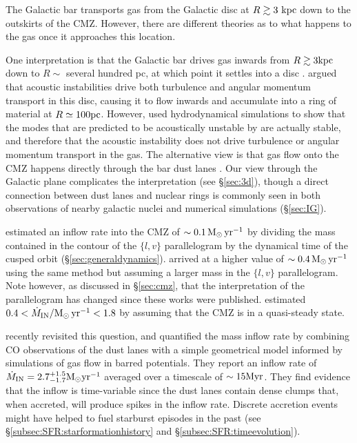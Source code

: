 The Galactic bar transports gas from the Galactic disc at $R\gtrsim3~\mbox{${\rm kpc}$}$ down to the outskirts of the CMZ. However, there are different theories as to what happens to the gas once it approaches this location. 

One interpretation is that the Galactic bar drives gas inwards from $R\gtrsim3\mbox{${\rm kpc}$}$ down to $R\sim$ several hundred pc, at which point it settles into a disc \citep{Krumholz2015, Krumholz2017}. 
\citet[][]{Kruijssen2014a} argued that acoustic instabilities \citep{Montenegro1999} drive both turbulence and angular momentum transport in this disc, causing it to flow inwards and accumulate into a ring of material at $R\simeq 100\mbox{${\rm pc}$}$. 
However, \citet{Sormani2020c} used hydrodynamical simulations to show that the modes that are predicted to be acoustically unstable by \citet{Montenegro1999} are actually stable, and therefore that the acoustic instability does not drive turbulence or angular momentum transport in the gas. 
The alternative view is that gas flow onto the CMZ happens directly through the bar dust lanes \citep[\S\ref{sec:generaldynamics} and Fig.~\ref{fig:sketch};][]{Fux1999,Liszt2006,Liszt2008,Rodriguez-Fernandez2008,Tress2020}. 
Our view through the Galactic plane complicates the interpretation (see \S\ref{sec:3d}), though a direct connection between dust lanes and nuclear rings is commonly seen in both observations of nearby galactic nuclei and numerical simulations (\S\ref{sec:IG}). 

\cite{Gerhard1992} estimated an inflow rate into the CMZ of $\sim0.1\,\mbox{M$_\odot$}\,\mbox{${\rm yr}$}^{-1}$ by dividing the mass contained in the contour of the $\{l,v\}$ parallelogram by the dynamical time of the cusped orbit (\S\ref{sec:generaldynamics}). \cite{Figer2004} arrived at a higher value of $\sim0.4\,\mbox{M$_\odot$}\,\mbox{${\rm yr}$}^{-1}$ using the same method but assuming a larger mass in the $\{l,v\}$ parallelogram. Note however, as discussed in \S\ref{sec:cmz}, that the interpretation of the parallelogram has changed since these works were published. \cite{Crocker2012} estimated $0.4<\dot{M}_\mathrm{IN}/\mbox{M$_\odot$}\,\mbox{${\rm yr}$}^{-1}<1.8$ by assuming that the CMZ is in a quasi-steady state.

\cite{Sormani2019b} recently revisited this question, and quantified the mass inflow rate by combining CO observations of the dust lanes with a simple geometrical model informed by simulations of gas flow in barred potentials. They report an inflow rate of $\dot{M}_\mathrm{IN} = 2.7^{+1.5}_{-1.7} \mbox{M$_\odot$} \mbox{${\rm yr}$}^{-1}$ averaged over a timescale of $\sim 15\mbox{${\rm Myr}$}$. 
They find evidence that the inflow is time-variable since the dust lanes contain dense clumps that, when accreted, will produce spikes in the inflow rate. Discrete accretion events might have helped to fuel starburst episodes in the past (see \S\ref{subsec:SFR:starformationhistory} and \S\ref{subsec:SFR:timeevolution}). 

